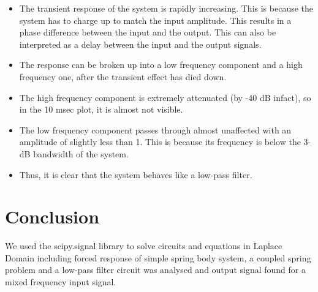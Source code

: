 \documentclass{article}
\begin{document}
\begin{itemize}
    
    \item
      The transient response of the system is rapidly increasing. This is
      because the system has to charge up to match the input amplitude. This
      results in a phase difference between the input and the output. This
      can also be interpreted as a delay between the input and the output
      signals.
    \item
      The response can be broken up into a low frequency component and a
      high frequency one, after the transient effect has died down.
    \item
      The high frequency component is extremely attenuated (by -40 dB
      infact), so in the 10 msec plot, it is almost not visible.
    \item
      The low frequency component passes through almost unaffected with an
      amplitude of slightly less than 1. This is because its frequency is
      below the 3-dB bandwidth of the system.
    \item
      Thus, it is clear that the system behaves like a low-pass filter.

\end{itemize}
    
\newpage
\section*{Conclusion}
We used the scipy.signal library to solve circuits and equations in Laplace Domain including forced response of simple spring body system, 
a coupled spring problem and a low-pass filter circuit was analysed and output signal found for a mixed frequency input signal.
\end{document}
